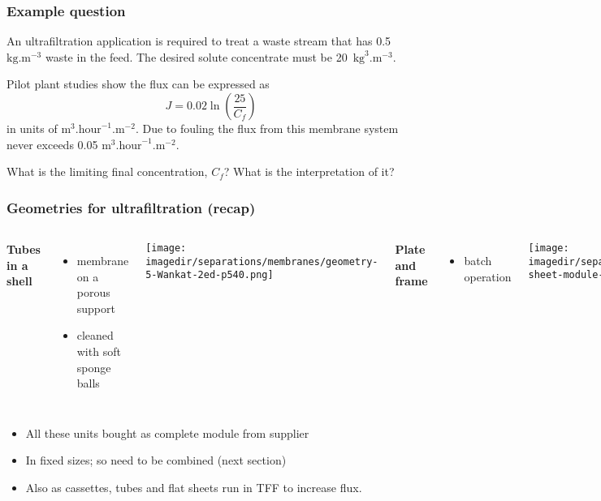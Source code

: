 \begin{frame}\frametitle{Example question}
	An ultrafiltration application is required to treat a waste stream that has 0.5~$\text{kg}\text{.m}^{-3}$ waste in the feed. The desired solute concentrate must be 20~$\text{kg}^3\text{.m}^{-3}$.
	
	\vspace{12pt}
	Pilot plant studies show the flux can be expressed as 
	\[
		J = 0.02 \ln \left(\frac{25}{C_f} \right)
	\]
	in units of $\text{m}^3.\text{hour}^{-1}.\text{m}^{-2}$. Due to fouling the flux from this membrane system never exceeds 0.05 $\text{m}^3.\text{hour}^{-1}.\text{m}^{-2}$.
	
	\vspace{12pt}
	What is the limiting final concentration, $C_f$? What is the interpretation of it?
\end{frame}

\begin{frame}\frametitle{Geometries for ultrafiltration (recap)}
	\begin{columns}[t]
			\textbf{Tubes in a shell}
				\begin{itemize}
					\item	membrane on a porous support
					\item	cleaned with soft sponge balls
				\end{itemize}
			\begin{center}
				\texttt{[image: \\imagedir/separations/membranes/geometry-5-Wankat-2ed-p540.png]}
			\end{center}
			\textbf{Plate and frame}
				\begin{itemize}
					\item	batch operation
				\end{itemize}
				\begin{center}
					\texttt{[image: \\imagedir/separations/membranes/flat-sheet-module-CRv2-5ed-p456.png]}
				\end{center}
	\end{columns}
	\begin{itemize}
		\item	All these units bought as complete module from supplier
		\item	In fixed sizes; so need to be combined (next section)
		\item	Also as cassettes, tubes and flat sheets run in TFF to increase flux. %
	\end{itemize}
\end{frame}

